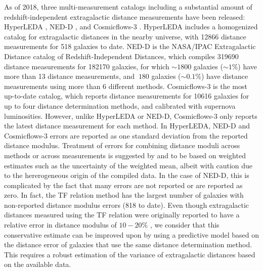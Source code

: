 \documentclass[a4paper,fleqn,usenatbib]{mnras}
\begin{document}
As of 2018, three multi-measurement catalogs including a substantial amount of redshift-independent extragalactic distance measurements have been released: HyperLEDA \citep{hyperleda}, NED-D \citep{ned07,ned}, and Cosmicflows-3 \citep{cosmicflows}. HyperLEDA includes a homogenized catalog for extragalactic distances in the nearby universe, with 12866 distance measurements for 518 galaxies to date. NED-D is the NASA/IPAC Extragalactic Distance catalog of Redshift-Independent Distances, which compiles 319690 distance measurements for 182170 galaxies, for which  $\sim1800$ galaxies ($\sim1$\%) have more than 13 distance measurements, and $~180$ galaxies ($\sim0.1$\%) have distance measurements using more than 6 different methods. Cosmicflows-3 is the most up-to-date catalog, which reports distance measurements for 10616 galaxies for up to four distance determination methods, and calibrated with supernova luminosities. However, unlike HyperLEDA or NED-D, Cosmicflows-3 only reports the latest distance measurement for each method. In HyperLEDA, NED-D and Cosmicflows-3 errors are reported as one standard deviation from the reported distance modulus. Treatment of errors for combining distance moduli across methods or across measurements is suggested by \citet{ned07} and \citet{cosmicflows} to be based on weighted estimates such as the uncertainty of the weighted mean, albeit with caution due to the hererogeneous origin of the compiled data. In the case of NED-D, this is complicated by the fact that many errors are not reported or are reported as zero. In fact, the TF relation method has the largest number of galaxies with non-reported distance modulus errors (818 to date). Even though extragalactic distances measured using the TF relation were originally reported to have a relative error in distance modulus of $10-20$\% \citep{tforig}, we consider that this conservative estimate can be improved upon by using a predictive model based on the distance error of galaxies that use the same distance determination method. This requires a robust estimation of the variance of extragalactic distances based on the available data.\\
\end{document}
